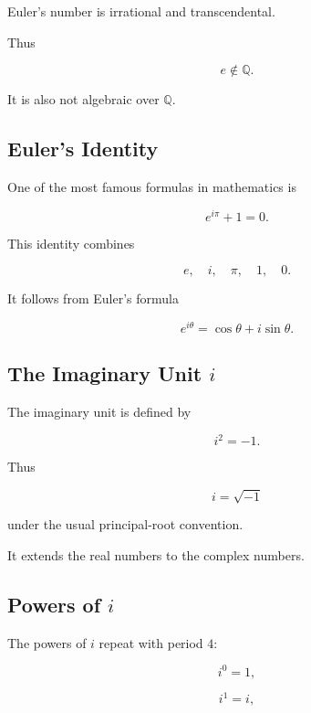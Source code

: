 Euler's number is irrational and transcendental.

Thus

\[
\boxed{
e\notin\mathbb{Q}.
}
\]

It is also not algebraic over \(\mathbb{Q}\).

\subsection{Euler's Identity}
\label{subsec:euler-identity-reference}

One of the most famous formulas in mathematics is

\[
\boxed{
e^{i\pi}+1=0.
}
\]

This identity combines

\[
\boxed{
e,
\quad
i,
\quad
\pi,
\quad
1,
\quad
0.
}
\]

It follows from Euler's formula

\[
\boxed{
e^{i\theta}
=
\cos\theta+i\sin\theta.
}
\]

\subsection{The Imaginary Unit \(i\)}
\label{subsec:imaginary-unit-reference}

The imaginary unit is defined by

\[
\boxed{
i^2=-1.
}
\]

Thus

\[
\boxed{
i=\sqrt{-1}
}
\]

under the usual principal-root convention.

It extends the real numbers to the complex numbers.

\subsection{Powers of \(i\)}
\label{subsec:powers-of-i-reference}

The powers of \(i\) repeat with period \(4\):

\[
\boxed{
i^0=1,
}
\]

\[
\boxed{
i^1=i,
}
\]

